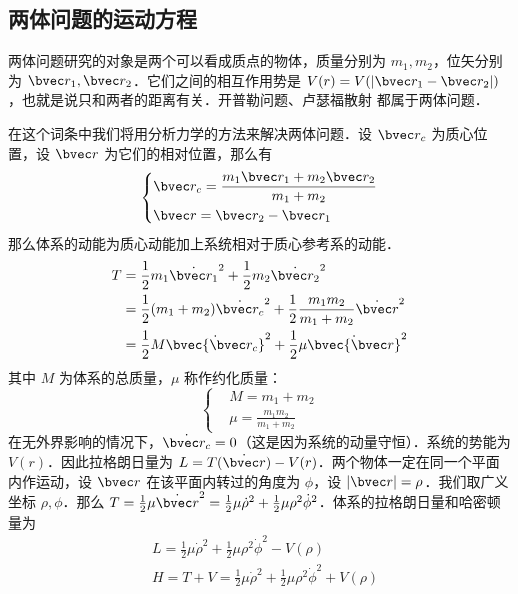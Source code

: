 
\subsection{两体问题的运动方程}
两体问题研究的对象是两个可以看成质点的物体，质量分别为 $m_1,m_2$，位矢分别为 $\bvec r_1,\bvec r_2$．它们之间的相互作用势是 $V(r)=V(|\bvec r_1-\bvec r_2|)$，也就是说只和两者的距离有关．开普勒问题、卢瑟福散射 都属于两体问题．

在这个词条中我们将用分析力学的方法来解决两体问题．设 $\bvec r_c$ 为质心位置，设 $\bvec r$ 为它们的相对位置，那么有
\begin{equation}
\left\{
\begin{aligned}
&\bvec r_c=\frac{m_1\bvec r_1+ m_2\bvec r_2}{m_1+m_2}\\
&\bvec r=\bvec r_2-\bvec r_1
\end{aligned}
\right.
\end{equation}
那么体系的动能为质心动能加上系统相对于质心参考系的动能．
\begin{equation}
\begin{aligned}
T&=\frac{1}{2}m_1 \dot{\bvec r_1}^2+\frac{1}{2}m_2 \dot{\bvec r_2}^2\\
&=\frac{1}{2}(m_1+m_2)\dot{\bvec r_c}^2+\frac{1}{2}\frac{m_1m_2}{m_1+m_2}\dot{\bvec r}^2\\
&=\frac{1}{2}M \dot{\bvec{\bvec r_c}}^2+\frac{1}{2}\mu \dot{\bvec{\bvec r}}^2
\end{aligned}
\end{equation}
其中 $M$ 为体系的总质量，$\mu$ 称作约化质量：
\begin{equation}
\left\{
\begin{aligned}
&M=m_1+m_2\\
&\mu=\frac{m_1m_2}{m_1+m_2}
\end{aligned}
\right.
\end{equation}
在无外界影响的情况下，$\dot{\bvec r_c}=0$（这是因为系统的动量守恒）．系统的势能为 $V(r)$．因此拉格朗日量为 $L=T(\dot{\bvec r})-V(r)$．两个物体一定在同一个平面内作运动，设 $\bvec r$ 在该平面内转过的角度为 $\phi$，设 $|\bvec r|=\rho$．我们取广义坐标 $\rho,\phi$．那么 $T=\frac{1}{2}\mu \dot{\bvec r}^2=\frac{1}{2}\mu \dot \rho^2+\frac{1}{2}\mu \rho^2\dot\phi^2$．体系的拉格朗日量和哈密顿量为
\begin{equation}
\begin{aligned}
&L=\frac{1}{2}\mu \dot \rho^2+\frac{1}{2}\mu \rho^2\dot\phi^2-V(\rho)\\
&H=T+V=\frac{1}{2}\mu \dot \rho^2+\frac{1}{2}\mu \rho^2\dot\phi^2+V(\rho)
\end{aligned}
\end{equation}
